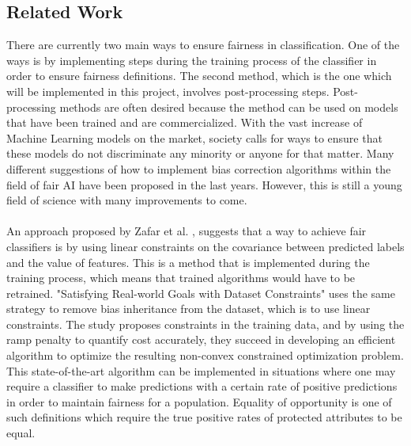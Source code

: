 \documentclass[11pt, fleqn, titlepage]{article}
\begin{document}
	\subsection{Related Work}
	There are currently two main ways to ensure fairness in classification. One of the ways is by implementing steps during the training process of the classifier in order to ensure fairness definitions. The second method, which is the one which will be implemented in this project, involves post-processing steps. Post-processing methods are often desired because the method can be used on models that have been trained and are commercialized. With the vast increase of Machine Learning models on the market, society calls for ways to ensure that these models do not discriminate any minority or anyone for that matter. Many different suggestions of how to implement bias correction algorithms within the field of fair AI have been proposed in the last years. However, this is still a young field of science with many improvements to come.\\\\
	\noindent
	An approach proposed by Zafar et al. \cite{Zafar}, suggests that a way to achieve fair classifiers is by using linear constraints on the covariance between predicted labels and the value of features. This is a method that is implemented during the training process, which means that trained algorithms would have to be retrained. "Satisfying Real-world Goals with Dataset Constraints" uses the same strategy to remove bias inheritance from the dataset, which is to use linear constraints. The study proposes constraints in the training data, and by using the ramp penalty to quantify cost accurately, they succeed in developing an efficient algorithm to optimize the resulting non-convex constrained optimization problem. This state-of-the-art algorithm can be implemented in situations where one may require a classifier to make predictions with a certain rate of positive predictions in order to maintain fairness for a population. Equality of opportunity is one of such definitions which require the true positive rates of protected attributes to be equal. \cite{g_goh} \\
	
\end{document}
